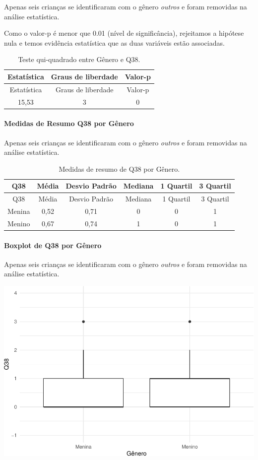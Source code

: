 \documentclass[]{article}
\let\oldparagraph\paragraph
\renewcommand{\paragraph}[1]{\oldparagraph{#1}\mbox{}}
\begin{document}
Apenas seis crianças se identificaram com o gênero \emph{outros} e foram removidas na análise estatística.

Como o valor-p é menor que 0.01 (nível de significância), rejeitamos a hipótese nula e temos evidência estatística que as duas variáveis estão associadas.

\begin{longtable}[]{@{}ccc@{}}
\caption{\label{tab:unnamed-chunk-1442}Teste qui-quadrado entre Gênero e Q38.}\tabularnewline
\toprule
Estatística & Graus de liberdade & Valor-p\tabularnewline
\midrule
\endfirsthead
\toprule
Estatística & Graus de liberdade & Valor-p\tabularnewline
\midrule
\endhead
15,53 & 3 & 0\tabularnewline
\bottomrule
\end{longtable}

\cleardoublepage

\hypertarget{medidas-de-resumo-q38-por-guxeanero}{%
\paragraph{Medidas de Resumo Q38 por Gênero}\label{medidas-de-resumo-q38-por-guxeanero}}

Apenas seis crianças se identificaram com o gênero \emph{outros} e foram removidas na análise estatística.

\begin{longtable}[]{@{}cccccc@{}}
\caption{\label{tab:unnamed-chunk-1443}Medidas de resumo de Q38 por Gênero.}\tabularnewline
\toprule
Q38 & Média & Desvio Padrão & Mediana & 1 Quartil & 3 Quartil\tabularnewline
\midrule
\endfirsthead
\toprule
Q38 & Média & Desvio Padrão & Mediana & 1 Quartil & 3 Quartil\tabularnewline
\midrule
\endhead
Menina & 0,52 & 0,71 & 0 & 0 & 1\tabularnewline
Menino & 0,67 & 0,74 & 1 & 0 & 1\tabularnewline
\bottomrule
\end{longtable}

\hypertarget{boxplot-de-q38-por-guxeanero}{%
\paragraph{Boxplot de Q38 por Gênero}\label{boxplot-de-q38-por-guxeanero}}

Apenas seis crianças se identificaram com o gênero \emph{outros} e foram removidas na análise estatística.

\begin{center}\includegraphics[width=0.75\linewidth]{relatorio_covid19_files/figure-latex/unnamed-chunk-1444-1} \end{center}
\end{document}

